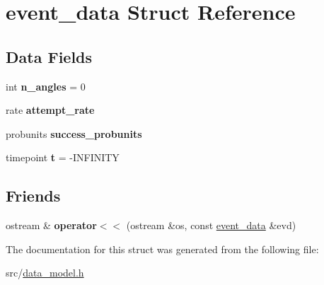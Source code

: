 \hypertarget{structevent__data}{}\section{event\+\_\+data Struct Reference}
\label{structevent__data}
\subsection*{Data Fields}
\begin{DoxyCompactItemize}
\item 
\mbox{\label{structevent__data_a4ac8163657589d149ed034f321b61ce9}} 
int {\bfseries n\+\_\+angles} = 0
\item 
\mbox{\label{structevent__data_aa12da1e46a4e8e401433e90fd97fc015}} 
rate {\bfseries attempt\+\_\+rate}
\item 
\mbox{\label{structevent__data_ae13f0249bae2966da48518074f2b3495}} 
probunits {\bfseries success\+\_\+probunits}
\item 
\mbox{\label{structevent__data_aa2f4362fb8d987420d6941e29cb50710}} 
timepoint {\bfseries t} = -\/I\+N\+F\+I\+N\+I\+TY
\end{DoxyCompactItemize}
\subsection*{Friends}
\begin{DoxyCompactItemize}
\item 
\mbox{\label{structevent__data_a39ddcc1bb1a2d01e9868f33afdb1beba}} 
ostream \& {\bfseries operator$<$$<$} (ostream \&os, const \hyperlink{structevent__data}{event\+\_\+data} \&evd)
\end{DoxyCompactItemize}


The documentation for this struct was generated from the following file\+:\begin{DoxyCompactItemize}
\item 
src/\hyperlink{data__model_8h}{data\+\_\+model.\+h}\end{DoxyCompactItemize}
